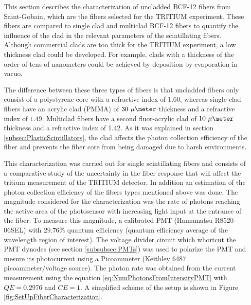 This section describes the characterization of uncladded BCF-12 fibers from Saint-Gobain, which are the fibers selected for the TRITIUM experiment. These fibers are compared to single clad and multiclad BCF-12 fibers to quantify the influence of the clad in the relevant parameters of the scintillating fibers. Although commercial clads are too thick for the TRITIUM experiment, a low thickness clad could be developed. For example, clads with a thickness of the order of tens of nanometers could be achieved by deposition by evaporation in vacuo. 

The difference between these three types of fibers is that uncladded fibers only consist of a polystyrene core with a refractive index of $1.60$, whereas single clad fibers have an acrylic clad (PMMA) of $30~\mu\meter$ thickness and a refractive index of $1.49$. Multiclad fibers have a second fluor-acrylic clad of $10~\mu\meter$ thickness  and a refractive index of 1.42. As it was explained in section \ref{subsec:PlasticScintillators}, the clad affects the photon collection efficiency of the fiber and prevents the fiber core from being damaged due to harsh environments.




This characterization was carried out for single scintillating fibers and consists of a comparative study of the uncertainty in the fiber response that will affect the tritium measurement of the TRITIUM detector. In addition an estimation of the photon collection efficiency of the fibers types mentioned above was done. The magnitude considered for the characterization was the rate of photons reaching the active area of the photosensor with increasing light input at the entrance of the fiber. To measure this magnitude, a calibrated PMT (Hamamatsu R8520-06SEL) with $29.76\%$ quantum efficiency (quantum efficiency average of the wavelength region of interest). The voltage divider circuit which whortcut the PMT dynodes (see section \ref{subsubsec:PMTs}) was used to polarize the PMT  and mesure its photocurrent using a Picoammeter (Keithley 6487 picoammeter/voltage source). The photon rate was obtained from the current measurement using the equation \ref{eq:NumPhotonsFromIntensityPMT} with $QE=0.2976$ and $CE=1$. A simplified scheme of the setup is shown in Figure \ref{fig:SetUpFiberCharacterization}.

